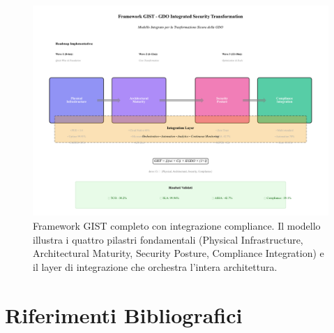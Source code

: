 \begin{figure}[htbp]
\centering
\includegraphics[width=\textwidth]{thesis_figures/cap4/figura_4_3_gist_framework.pdf}
\caption{Framework GIST completo con integrazione compliance. Il modello illustra i quattro pilastri fondamentali (Physical Infrastructure, Architectural Maturity, Security Posture, Compliance Integration) e il layer di integrazione che orchestra l'intera architettura.}
\label{fig:gist_framework}
\end{figure}

\section*{Riferimenti Bibliografici}

